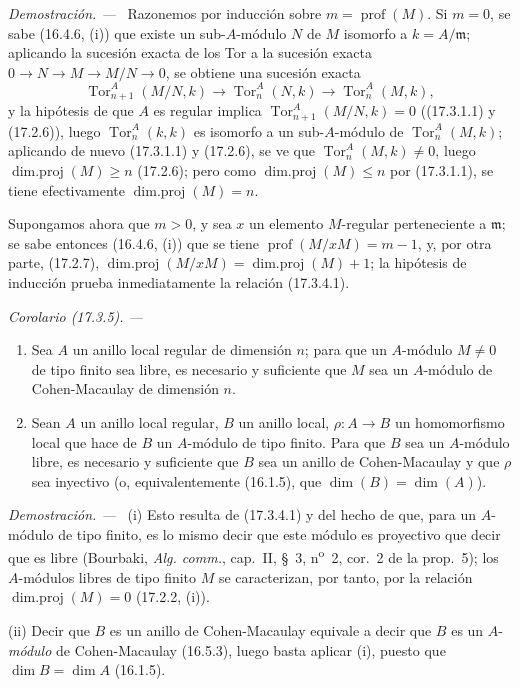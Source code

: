 \documentclass[10pt,oneside]{book}
\makeatletter
\newcommand{\setmanualcurrentlabel}[1]{\def\@currentlabel{#1}}
\newcommand{\oldpage}[2][]{%
  \setcounter{footnote}{0}%
  \marginpar{\scriptsize\textbf{#1}~|~#2}\ignorespaces}
\newenvironment{corollary}[1][]{%
  \setmanualcurrentlabel{#1}\par\medskip\noindent\itshape Corolario (#1). ---\ }{\par}
\newenvironment{proof}{%
  \par\medskip\noindent\textit{Demostración. ---\ }}{\par}
\providecommand{\setmin}{-}%
\makeatother
\begin{document}
\begin{proof}
Razonemos por inducción sobre $m=\operatorname{prof}(M)$. Si $m=0$, se sabe
(16.4.6, (i)) que existe un sub-$A$-módulo $N$ de $M$ isomorfo a
$k=A/\mathfrak{m}$; aplicando la sucesión exacta de los Tor a la sucesión
exacta $0\longrightarrow N\longrightarrow M\longrightarrow M/N\longrightarrow0$,
se obtiene una sucesión exacta
\[
  \operatorname{Tor}^A_{n+1}(M/N,k)\longrightarrow
  \operatorname{Tor}^A_n(N,k)\longrightarrow
  \operatorname{Tor}^A_n(M,k),
\]
y la hipótesis de que $A$ es regular implica
$\operatorname{Tor}^A_{n+1}(M/N,k)=0$ ((17.3.1.1) y (17.2.6)), luego
$\operatorname{Tor}^A_n(k,k)$ es isomorfo a un sub-$A$-módulo de
$\operatorname{Tor}^A_n(M,k)$; aplicando de nuevo (17.3.1.1) y (17.2.6), se
ve que $\operatorname{Tor}^A_n(M,k)\neq0$, luego
$\operatorname{dim.proj}(M)\geq n$ (17.2.6); pero como
$\operatorname{dim.proj}(M)\leq n$ por (17.3.1.1), se tiene efectivamente
$\operatorname{dim.proj}(M)=n$.

Supongamos ahora que $m>0$, y sea $x$ un elemento $M$-regular perteneciente a
$\mathfrak{m}$; se sabe entonces (16.4.6, (i)) que se tiene
$\operatorname{prof}(M/xM)=m\setmin 1$, y, por otra parte, (17.2.7),
$\operatorname{dim.proj}(M/xM)=\operatorname{dim.proj}(M)+1$; la hipótesis de
inducción prueba inmediatamente la relación (17.3.4.1).
\end{proof}

\oldpage[0\textsubscript{IV-1}]{50}

\begin{corollary}[17.3.5]
\label{0.17.3.5-es}
\begin{enumerate}
  \item[\rm(i)] Sea $A$ un anillo local regular de dimensión $n$; para que un
  $A$-módulo $M\neq0$ de tipo finito sea libre, es necesario y suficiente que
  $M$ sea un $A$-módulo de Cohen-Macaulay de dimensión $n$.
  \item[\rm(ii)] Sean $A$ un anillo local regular, $B$ un anillo local,
  $\rho:A\to B$ un homomorfismo local que hace de $B$ un $A$-módulo de tipo
  finito. Para que $B$ sea un $A$-módulo libre, es necesario y suficiente que
  $B$ sea un anillo de Cohen-Macaulay y que $\rho$ sea inyectivo \textup{(o,
  equivalentemente (16.1.5), que $\dim(B)=\dim(A)$)}.
\end{enumerate}
\end{corollary}

\begin{proof}
(i) Esto resulta de (17.3.4.1) y del hecho de que, para un $A$-módulo de tipo
finito, es lo mismo decir que este módulo es proyectivo que decir que es libre
(Bourbaki, \emph{Alg. comm.}, cap.~II, \S~3, n\textsuperscript{o}~2, cor.~2 de
la prop.~5); los $A$-módulos libres de tipo finito $M$ se caracterizan, por
tanto, por la relación $\operatorname{dim.proj}(M)=0$ (17.2.2, (i)).

(ii) Decir que $B$ es un anillo de Cohen-Macaulay equivale a decir que $B$ es
un $A$-\emph{módulo} de Cohen-Macaulay (16.5.3), luego basta aplicar (i), puesto que
$\dim B=\dim A$ (16.1.5).
\end{proof}
\end{document}
